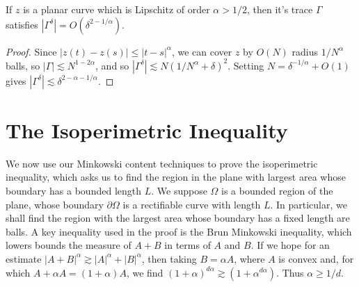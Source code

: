 \begin{theorem}
  If $z$ is a planar curve which is Lipschitz of order $\alpha > 1/2$, then it's trace $\Gamma$ satisfies $|\Gamma^\delta| = O(\delta^{2-1/\alpha})$.
\end{theorem}
\begin{proof}
  Since $|z(t) - z(s)| \leq |t - s|^\alpha$, we can cover $z$ by $O(N)$ radius $1/N^\alpha$ balls, so $|\Gamma| \lesssim N^{1-2\alpha}$, and so $|\Gamma^\delta| \lesssim N (1/N^\alpha + \delta)^2$. Setting $N = \delta^{-1/\alpha} + O(1)$ gives $|\Gamma^\delta| \lesssim \delta^{2-\alpha - 1/\alpha}$.
\end{proof}

\section{The Isoperimetric Inequality}

We now use our Minkowski content techniques to prove the isoperimetric inequality, which asks us to find the region in the plane with largest area whose boundary has a bounded length $L$. We suppose $\Omega$ is a bounded region of the plane, whose boundary $\partial \Omega$ is a rectifiable curve with length $L$. In particular, we shall find the region with the largest area whose boundary has a fixed length are balls. A key inequality used in the proof is the Brun Minkowski inequality, which lowers bounds the measure of $A+B$ in terms of $A$ and $B$. If we hope for an estimate $|A+B|^\alpha \gtrsim |A|^\alpha + |B|^\alpha$, then taking $B = \alpha A$, where $A$ is convex and, for which $A + \alpha A = (1 + \alpha)A$, we find $(1 + \alpha)^{d\alpha} \gtrsim (1 + \alpha^{d\alpha})$. Thus $\alpha \geq 1/d$.

